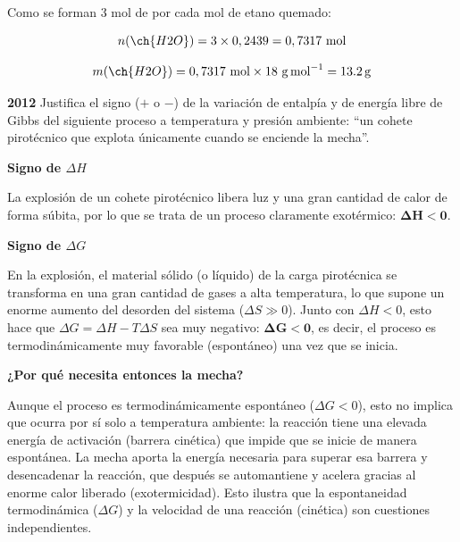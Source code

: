 \begin{exerciseEVAU}
\begin{solu}
        Como se forman 3 mol de  por cada mol de etano quemado:

        \begin{equation*}
            n(\ch{H2O}) = 3 \times 0,2439 = 0,7317 \ \text{mol}
        \end{equation*}

        \begin{equation*}
            m(\ch{H2O}) = 0,7317 \ \text{mol} \times 18 \ \si{\gram\per\mole} = \SI{13.2}{\gram}
        \end{equation*}

    \end{solu}
\end{exerciseEVAU}

\begin{exerciseEVAU}
    \textbf{2012} Justifica el signo (\(+\) o \(-\)) de la variación de entalpía y de energía libre de Gibbs del siguiente proceso a
    temperatura y presión ambiente: “un cohete pirotécnico que explota únicamente cuando se enciende la mecha”.

    \begin{solu}

        \textbf{Signo de \(\Delta H\)}

        La explosión de un cohete pirotécnico libera luz y una gran cantidad de calor de forma súbita, por lo que se trata de un proceso claramente exotérmico: \(\boldsymbol{\Delta H < 0}\).

        \textbf{Signo de \(\Delta G\)}

        En la explosión, el material sólido (o líquido) de la carga pirotécnica se transforma en una gran cantidad de gases a alta temperatura, lo que supone un enorme aumento del desorden del sistema (\(\Delta S \gg 0\)). Junto con \(\Delta H < 0\), esto hace que \(\Delta G = \Delta H - T \Delta S\) sea muy negativo: \(\boldsymbol{\Delta G < 0}\), es decir, el proceso es termodinámicamente muy favorable (espontáneo) una vez que se inicia.

        \textbf{¿Por qué necesita entonces la mecha?}

        Aunque el proceso es termodinámicamente espontáneo (\(\Delta G < 0\)), esto no implica que ocurra por sí solo a temperatura ambiente: la reacción tiene una elevada energía de activación (barrera cinética) que impide que se inicie de manera espontánea. La mecha aporta la energía necesaria para superar esa barrera y desencadenar la reacción, que después se automantiene y acelera gracias al enorme calor liberado (exotermicidad). Esto ilustra que la espontaneidad termodinámica (\(\Delta G\)) y la velocidad de una reacción (cinética) son cuestiones independientes.

    \end{solu}
\end{exerciseEVAU}

